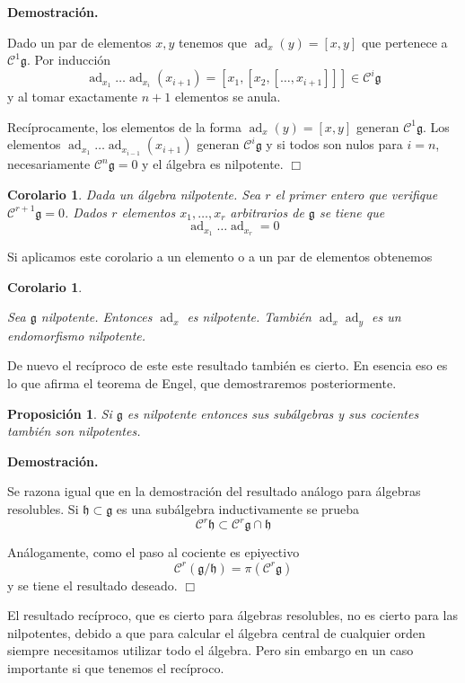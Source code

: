 \documentclass[a4paper,draft,12pt]{article}
\newtheorem{propo}[teo]{Proposición}%
\newtheorem{cor}[teo]{Corolario}%
\newcommand{\dem}{\noindent \textbf{Demostración. }\vspace{0.3 cm}}%
\newcommand{\g}{\mathfrak{g}}%
\newcommand{\fin}{ $\Box $ \vspace{0.4 cm}}
\newcommand{\central}{\mathcal{C}}%
\DeclareMathOperator{\ad}{ad}  %
\begin{document}
\dem

Dado un par de elementos $x,y$ tenemos que $\ad_x(y)=[x,y]$ que pertenece a $\central^1\g$.  Por inducción 
$$
\ad_{x_1}\dots\ad_{x_{i}}(x_{i+1})= [x_1,[x_2,[\dots,x_{i+1}]]] \in \central^i\g
$$
y al tomar exactamente $n+1$ elementos se anula.

\bigskip

Recíprocamente, los elementos de la forma $\ad_x(y)=[x,y]$ generan $\central^1\g$. Los  elementos $\ad_{x_1}\dots\ad_{x_{i-1}}(x_{i+1})$ generan $\central^i\g$ y si todos son nulos para $i=n$, necesariamente $\central^n\g=0$ y el álgebra es nilpotente. \fin


\begin{cor}

Dada un álgebra nilpotente. Sea $r$ el primer entero que verifique $\central^{r+1}\g=0$.  Dados $r$ elementos $x_1,\dots,x_r$ arbitrarios de $\g$ se tiene que
$$
\ad_{x_1}\dots\ad_{x_r}=0
$$

\end{cor}

Si aplicamos este corolario a un elemento o a un par de elementos obtenemos

\begin{cor}\label{cor:adnilpotente}

Sea $\g$ nilpotente.  Entonces $\ad_x$ es nilpotente.  También $\ad_x\ad_y$ es un endomorfismo nilpotente.

\end{cor}

De nuevo el recíproco de este este resultado también es cierto.  En esencia eso es lo que afirma el teorema de Engel, que demostraremos posteriormente.


\begin{propo}

Si $\g$ es nilpotente entonces sus subálgebras y sus cocientes también son nilpotentes.

\end{propo}

\dem


Se razona igual que en la demostración del resultado análogo para álgebras resolubles.
Si $\mathfrak{h}\subset \g$ es una subálgebra inductivamente se prueba
$$
\central^r\mathfrak{h}\subset \central^r \g \cap \mathfrak{h}
$$

Análogamente, como el paso al cociente es epiyectivo
$$
\central^r(\g/\mathfrak{h})= \pi (\central^r \g)
$$
y se tiene el resultado deseado. \fin


El resultado recíproco, que es cierto para álgebras resolubles, no es cierto para las nilpotentes, debido a que para calcular el álgebra central de cualquier orden siempre necesitamos utilizar todo el álgebra.  Pero sin embargo en un caso  importante si que tenemos el recíproco.
\end{document}
